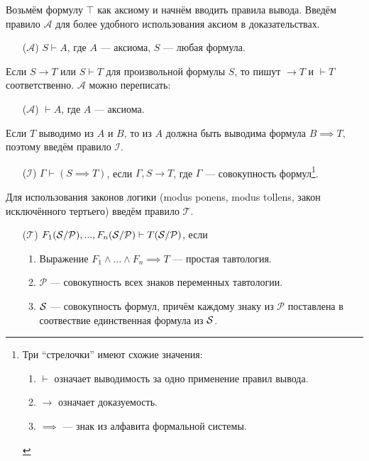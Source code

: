 \newcommand\taut{$\mathcal T$}
\newcommand\axiom{$\mathcal A$}
\newcommand\implic{$\mathcal I$}
\newcommand\Px{\mathcal P}
Возьмём формулу $\top$ как аксиому и начнём вводить правила вывода.
Введём правило \axiom{} для более удобного использования аксиом в доказательствах.
\begin{enumerate}
	\item[(\axiom)]{}$S\vdash A$, где $A$ --- аксиома, $S$ --- любая формула.
\end{enumerate}

Если $S\to T$ или $S\vdash T$ для произвольной формулы $S$,
то пишут $\to T$ и $\vdash T$ соответственно. \axiom{} можно переписать:
\begin{enumerate}
	\item[(\axiom)]{}$\vdash A$, где $A$ --- аксиома.
\end{enumerate}

Если $T$ выводимо из $A$ и $B$, то из $A$ должна быть выводима формула $B\implies T$,
поэтому введём правило \implic{}.
\begin{enumerate}
	\item[(\implic)]{}${\Gamma\vdash (S\implies T)}$, если $\Gamma,S\to T$,
	где $\Gamma$ --- совокупность формул\footnote[][-2cm]{
		Три ``стрелочки'' имеют схожие значения:
		\begin{enumerate}
			\item{}$\vdash$ означает выводимость за одно применение правил вывода.
			\item{}$\to$ означает доказуемость.
			\item{}$\implies$ --- знак из алфавита формальной системы.
		\end{enumerate}
	}.
\end{enumerate}

Для использования законов логики (modus ponens, modus tollens, закон
исключённого тертьего) введём правило \taut{}.
\begin{enumerate}
	\item[(\taut)]{}$F_1(\Sx/\Px),...,F_n(\Sx/\Px)\vdash T(\Sx/\Px)$, если
	\begin{enumerate}
		\item{}Выражение ${F_1\land...\land F_n\implies T}$ --- простая тавтология.
		\item{}$\Px$ --- совокупность всех знаков переменных тавтологии.
		\item{}$\mathcal S$ --- совокупность формул, причём каждому знаку из $\Px$
		поставлена в соотвествие единственная формула из $\mathcal S$.
	\end{enumerate}
\end{enumerate}

